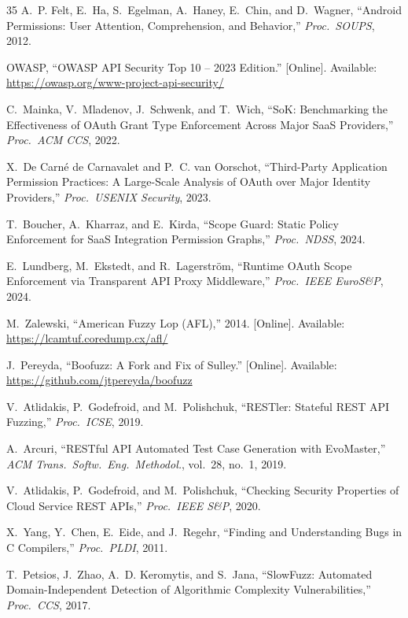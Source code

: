 \documentclass[conference]{IEEEtran}
\begin{document}
\begin{thebibliography}{35}
A.~P. Felt, E.~Ha, S.~Egelman, A.~Haney, E.~Chin, and D.~Wagner,
``Android Permissions: User Attention, Comprehension, and Behavior,''
\textit{Proc.\ SOUPS}, 2012.

OWASP, ``OWASP API Security Top 10 -- 2023 Edition.'' [Online].
Available: \url{https://owasp.org/www-project-api-security/}

C.~Mainka, V.~Mladenov, J.~Schwenk, and T.~Wich, ``SoK: Benchmarking
the Effectiveness of OAuth Grant Type Enforcement Across Major SaaS
Providers,'' \textit{Proc.\ ACM CCS}, 2022.

X.~De Carné de Carnavalet and P.~C. van Oorschot, ``Third-Party
Application Permission Practices: A Large-Scale Analysis of OAuth
over Major Identity Providers,'' \textit{Proc.\ USENIX Security},
2023.

T.~Boucher, A.~Kharraz, and E.~Kirda, ``Scope Guard: Static Policy
Enforcement for SaaS Integration Permission Graphs,''
\textit{Proc.\ NDSS}, 2024.

E.~Lundberg, M.~Ekstedt, and R.~Lagerstr\"{o}m, ``Runtime OAuth
Scope Enforcement via Transparent API Proxy Middleware,''
\textit{Proc.\ IEEE EuroS\&P}, 2024.

M.~Zalewski, ``American Fuzzy Lop (AFL),'' 2014. [Online]. Available:
\url{https://lcamtuf.coredump.cx/afl/}

J.~Pereyda, ``Boofuzz: A Fork and Fix of Sulley.'' [Online].
Available: \url{https://github.com/jtpereyda/boofuzz}

V.~Atlidakis, P.~Godefroid, and M.~Polishchuk, ``RESTler: Stateful
REST API Fuzzing,'' \textit{Proc.\ ICSE}, 2019.

A.~Arcuri, ``RESTful API Automated Test Case Generation with
EvoMaster,'' \textit{ACM Trans.\ Softw.\ Eng.\ Methodol.},
vol.~28, no.~1, 2019.

V.~Atlidakis, P.~Godefroid, and M.~Polishchuk, ``Checking Security
Properties of Cloud Service REST APIs,'' \textit{Proc.\ IEEE S\&P},
2020.

X.~Yang, Y.~Chen, E.~Eide, and J.~Regehr, ``Finding and
Understanding Bugs in C Compilers,'' \textit{Proc.\ PLDI}, 2011.

T.~Petsios, J.~Zhao, A.~D. Keromytis, and S.~Jana, ``SlowFuzz:
Automated Domain-Independent Detection of Algorithmic Complexity
Vulnerabilities,'' \textit{Proc.\ CCS}, 2017.


\end{thebibliography}
\end{document}
